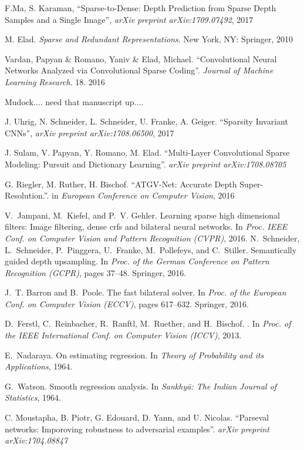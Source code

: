 \begin{thebibliography}{99}
  F.Ma, S. Karaman, ``Sparse-to-Dense: Depth Prediction from Sparse Depth Samples and a Single Image'', \emph{arXiv preprint arXiv:1709.07492}, 2017
  
  M. Elad. \emph{Sparse and Redundant Representations}. New York, NY: Springer, 2010

  Vardan, Papyan \& Romano, Yaniv \& Elad, Michael. ``Convolutional Neural Networks Analyzed via Convolutional Sparse Coding''. \emph{Journal of Machine Learning Research}. 18. 2016

  Mudock.... need that manuscript up....

  J. Uhrig, N. Schneider, L. Schneider, U. Franke, A. Geiger. ``Sparsity Invariant CNNs'', \emph{arXiv preprint arXiv:1708.06500}, 2017

  J. Sulam, V. Papyan, Y. Romano, M. Elad. ``Multi-Layer Convolutional Sparse Modeling: Pursuit and Dictionary Learning''. \emph{arXiv preprint arXiv:1708.08705}

  G. Riegler, M. Ruther, H. Bischof. ``ATGV-Net: Accurate Depth Super-Resolution.''. in \emph{European Conference on Computer Vision}, 2016

  V.~Jampani, M.~Kiefel, and P.~V. Gehler.
  \newblock Learning sparse high dimensional filters: Image filtering, dense crfs
  and bilateral neural networks.
  \newblock In {\em Proc. IEEE Conf. on Computer Vision and Pattern Recognition
    (CVPR)}, 2016.
  N.~Schneider, L.~Schneider, P.~Pinggera, U.~Franke, M.~Pollefeys, and
  C.~Stiller.
  \newblock Semantically guided depth upsampling.
  \newblock In {\em Proc. of the German Conference on Pattern Recognition
    (GCPR)}, pages 37--48. Springer, 2016.

J.~T. Barron and B.~Poole.
\newblock The fast bilateral solver.
\newblock In {\em Proc. of the European Conf. on Computer Vision (ECCV)}, pages
  617--632. Springer, 2016.

D.~Ferstl, C.~Reinbacher, R.~Ranftl, M.~Ruether, and H.~Bischof.
.
\newblock In {\em Proc. of the IEEE International Conf. on Computer Vision
  (ICCV)}, 2013.

E.~Nadaraya.
\newblock On estimating regression.
\newblock In {\em Theory of Probability and its Applications}, 1964.

G.~Watson.
\newblock Smooth regression analysis.
\newblock In {\em Sankhyā: The Indian Journal of Statistics}, 1964.

  C. Moustapha, B. Piotr, G. Edouard, D. Yann, and U. Nicolas. ``Parseval networks: Imporoving robustness to adversarial examples''. \emph{arXiv preprint arXiv:1704.08847}
\end{thebibliography}